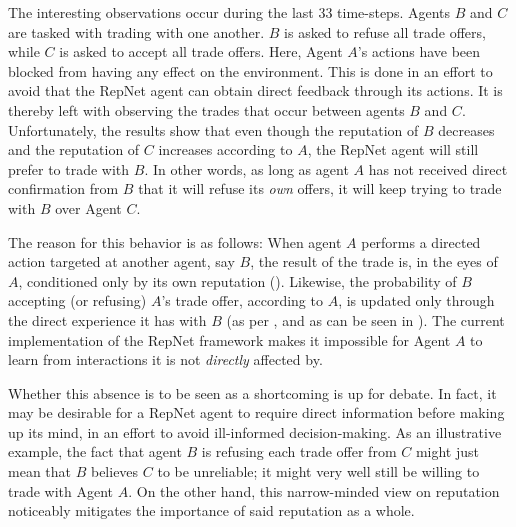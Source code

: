 The interesting observations occur during the last 33 time-steps. Agents $B$ and $C$ are tasked with trading with one another. $B$ is asked to refuse all trade offers, while $C$ is asked to accept all trade offers. Here, Agent $A$'s actions have been blocked from having any effect on the environment. This is done in an effort to avoid that the RepNet agent can obtain direct feedback through its actions. It is thereby left with observing the trades that occur between agents $B$ and $C$. Unfortunately, the results show that even though the reputation of $B$ decreases and the reputation of $C$ increases according to $A$, the RepNet agent will still prefer to trade with $B$. In other words, as long as agent $A$ has not received direct confirmation from $B$ that it will refuse its \textit{own} offers, it will keep trying to trade with $B$ over Agent $C$.

The reason for this behavior is as follows: When agent $A$ performs a directed action targeted at another agent, say $B$, the result of the trade is, in the eyes of $A$, conditioned only by its own reputation (). Likewise, the probability of $B$ accepting (or refusing) $A$'s trade offer, according to $A$, is updated only through the direct experience it has with $B$ (as per , and as can be seen in ). The current implementation of the RepNet framework makes it impossible for Agent $A$ to learn from interactions it is not \textit{directly} affected by.

Whether this absence is to be seen as a shortcoming is up for debate. In fact, it may be desirable for a RepNet agent to require direct information before making up its mind, in an effort to avoid ill-informed decision-making. As an illustrative example, the fact that agent $B$ is refusing each trade offer from $C$ might just mean that $B$ believes $C$ to be unreliable; it might very well still be willing to trade with Agent $A$. On the other hand, this narrow-minded view on reputation noticeably mitigates the importance of said reputation as a whole.



